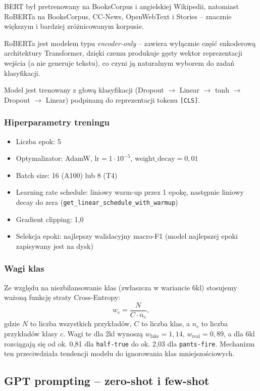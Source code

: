 \documentclass[11pt,a4paper]{article}
\begin{document}
BERT był pretrenowany na BooksCorpus i angielskiej Wikipedii, natomiast
RoBERTa na BooksCorpus, CC-News, OpenWebText i Stories -- znacznie
większym i bardziej zróżnicowanym korpusie.

RoBERTa jest modelem typu \emph{encoder-only} -- zawiera wyłącznie część
enkoderową architektury Transformer, dzięki czemu produkuje gęsty wektor
reprezentacji wejścia (a nie generuje tekstu), co czyni ją naturalnym
wyborem do zadań klasyfikacji.

Model jest trenowany z głową klasyfikacji (Dropout $\to$ Linear $\to$ tanh
$\to$ Dropout $\to$ Linear) podpinaną do reprezentacji tokenu \texttt{[CLS]}.

\subsubsection{Hiperparametry treningu}

\begin{itemize}
  \item Liczba epok: 5
  \item Optymalizator: AdamW, $\text{lr}=1\!\cdot\!10^{-5}$, $\text{weight\_decay}=0{,}01$
  \item Batch size: 16 (A100) lub 8 (T4)
  \item Learning rate schedule: liniowy warm-up przez 1 epokę, następnie liniowy
        decay do zera (\texttt{get\_linear\_schedule\_with\_warmup})
  \item Gradient clipping: 1{,}0
  \item Selekcja epoki: najlepszy walidacyjny macro-F1 (model najlepszej epoki
        zapisywany jest na dysk)
\end{itemize}

\subsubsection{Wagi klas}

Ze względu na niezbilansowanie klas (zwłaszcza w wariancie 6kl) stosujemy
ważoną funkcję straty Cross-Entropy:
\[
w_c = \frac{N}{C \cdot n_c},
\]
gdzie $N$ to liczba wszystkich przykładów, $C$ to liczba klas, a $n_c$ to
liczba przykładów klasy $c$. Wagi te dla 2kl wynoszą $w_{\text{fake}}=1{,}14$,
$w_{\text{real}}=0{,}89$, a dla 6kl rozciągają się od ok. 0{,}81 dla
\texttt{half-true} do ok. 2{,}03 dla \texttt{pants-fire}. Mechanizm ten
przeciwdziała tendencji modelu do ignorowania klas mniejszościowych.

\subsection{GPT prompting -- zero-shot i few-shot}
\end{document}
